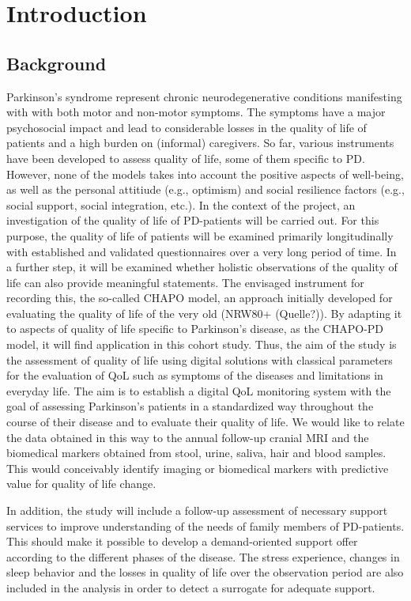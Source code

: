 \documentclass[
	a4paper, 
	11.5pt,
	headings=small, 
	twoside, 
	titlepage=firstiscover, 
 	pagesize=auto,
  	version=last,
	open=any,
	BCOR=14mm,
  	chapterprefix=false]{scrbook}
\begin{document}
\section{Introduction}
\subsection{Background}
Parkinson's syndrome represent chronic neurodegenerative conditions manifesting with with both motor and non-motor symptoms. The symptoms have a major psychosocial impact and lead to considerable losses in the quality of life of patients and a high burden on (informal) caregivers. So far, various instruments have been developed to assess quality of life, some of them specific to \ac{PD}. However, none of the models takes into account the positive aspects of well-being, as well as the personal attitiude (e.g., optimism)  and social resilience factors (e.g., social support, social integration, etc.). In the context of the project, an investigation of the quality of life of \ac{PD}-patients will be carried out. For this purpose, the quality of life of patients will be examined primarily longitudinally with established and validated questionnaires over a very long period of time. In a further step, it will be examined whether holistic observations of the quality of life can also provide meaningful statements. The envisaged instrument for recording this, the so-called \ac{CHAPO} model, an approach initially developed for evaluating the quality of life of the very old (NRW80+ (Quelle?)). By adapting it to aspects of quality of life specific to Parkinson's disease, as the \acs{CHAPO-PD} model, it will find application in this cohort study. Thus, the aim of the study is the assessment of quality of life using digital solutions with classical parameters for the evaluation of \acl{QoL} such as symptoms of the diseases and limitations in everyday life. The aim is to establish a digital \ac{QoL} monitoring system with the goal of assessing Parkinson's patients in a standardized way throughout the course of their disease and to evaluate their quality of life.
We would like to relate the data obtained in this way to the annual follow-up cranial MRI and the biomedical markers obtained from stool, urine, saliva, hair and blood samples. This would conceivably identify imaging or biomedical markers with predictive value for quality of life change.

In addition, the study will include a follow-up assessment of necessary support services to improve understanding of the needs of family members of \ac{PD}-patients. This should make it possible to develop a demand-oriented support offer according to the different phases of the disease. The stress experience, changes in sleep behavior and the losses in quality of life over the observation period are also included in the analysis in order to detect a surrogate for adequate support.
\end{document}
